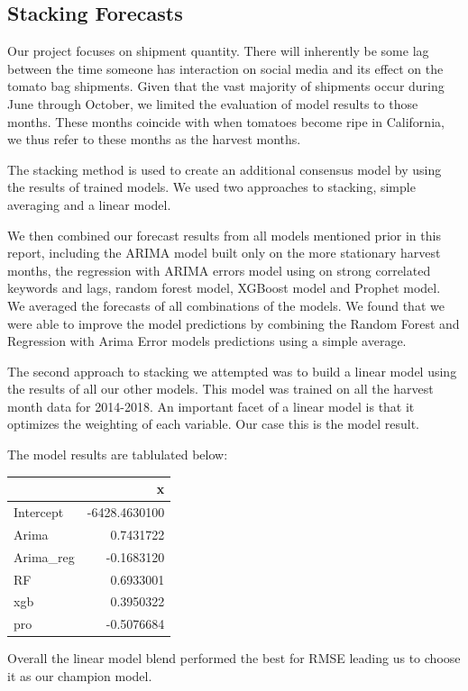 \documentclass[12pt,oneside]{chicagocapstone}
\begin{document}
\subsection*{Stacking Forecasts}\label{findings-Stacking}

Our project focuses on shipment quantity. There will inherently be some
lag between the time someone has interaction on social media and its
effect on the tomato bag shipments. Given that the vast majority of
shipments occur during June through October, we limited the evaluation
of model results to those months. These months coincide with when
tomatoes become ripe in California, we thus refer to these months as the
harvest months.

The stacking method is used to create an additional consensus model by
using the results of trained models. We used two approaches to stacking,
simple averaging and a linear model.

We then combined our forecast results from all models mentioned prior in
this report, including the ARIMA model built only on the more stationary
harvest months, the regression with ARIMA errors model using on strong
correlated keywords and lags, random forest model, XGBoost model and
Prophet model. We averaged the forecasts of all combinations of the
models. We found that we were able to improve the model predictions by
combining the Random Forest and Regression with Arima Error models
predictions using a simple average.

The second approach to stacking we attempted was to build a linear model
using the results of all our other models. This model was trained on all
the harvest month data for 2014-2018. An important facet of a linear
model is that it optimizes the weighting of each variable. Our case this
is the model result.

The model results are tablulated below:
\begin{longtable}[]{@{}lr@{}}
\toprule
& x\tabularnewline
\midrule
\endhead
Intercept & -6428.4630100\tabularnewline
Arima & 0.7431722\tabularnewline
Arima\_reg & -0.1683120\tabularnewline
RF & 0.6933001\tabularnewline
xgb & 0.3950322\tabularnewline
pro & -0.5076684\tabularnewline
\bottomrule
\end{longtable}
Overall the linear model blend performed the best for RMSE leading us to
choose it as our champion model.
\end{document}

